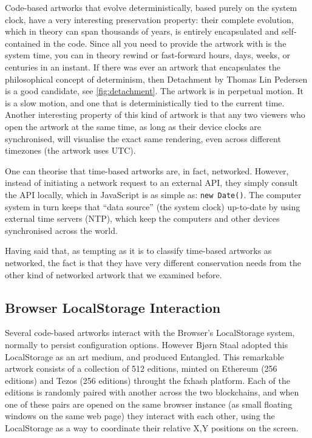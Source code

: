 Code-based artworks that evolve deterministically, based purely on the system clock, have a very interesting preservation property: their complete evolution, which in theory can span thousands of years, is entirely encapsulated and self-contained in the code. Since all you need to provide the artwork with is the system time, you can in theory rewind or fast-forward hours, days, weeks, or centuries in an instant. If there was ever an artwork that encapsulates the philosophical concept of determinism, then Detachment by Thomas Lin Pedersen is a good candidate, see \autoref{fig:detachment}. The artwork is in perpetual motion. It is a slow motion, and one that is deterministically tied to the current time.
Another interesting property of this kind of artwork is that any two viewers who open the artwork at the same time, as long as their device clocks are synchronised, will visualise the exact same rendering, even across different timezones (the artwork uses UTC).

One can theorise that time-based artworks are, in fact, networked. However, instead of initiating a network request to an external API, they simply consult the API locally, which in JavaScript is as simple as: \texttt{new Date()}. The computer system in turn keeps that ``data source'' (the system clock) up-to-date by using external time servers (NTP), which keep the computers and other devices synchronised across the world.

Having said that, as tempting as it is to classify time-based artworks as networked, the fact is that they have very different conservation needs from the other kind of networked artwork that we examined before.


\subsection{Browser LocalStorage Interaction}

Several code-based artworks interact with the Browser's LocalStorage system, normally to persist configuration options. However Bjørn Staal adopted this LocalStorage as an art medium, and produced Entangled. This remarkable artwork consists of a collection of 512 editions, minted on Ethereum (256 editions) and Tezos (256 editions) throught the fxhash platform. Each of the editions is randomly paired with another across the two blockchains, and when one of these pairs are opened on the same browser instance (as small floating windows on the same web page) they interact with each other, using the LocalStorage as a way to coordinate their relative X,Y positions on the screen.

